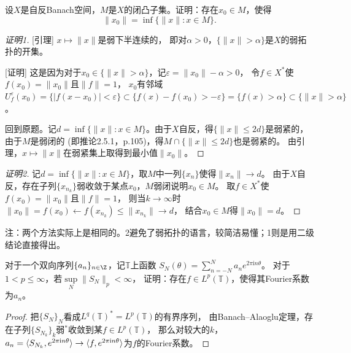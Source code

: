\begin{19}
    设$X$是自反Banach空间，$M$是$X$的闭凸子集。证明：存在$x_0\in M$，使得
    $$\|x_0\|=\inf\{\|x\|:x\in M\}.$$
\end{19}
\begin{proof}[证明1]
    [引理] $x\mapsto\|x\|$是弱下半连续的，
    即对$\alpha>0$，$\{\|x\|>\alpha\}$是$X$的弱拓扑的开集。

    [证明] 这是因为对于$x_0\in\{\|x\|>\alpha\}$，记$\varepsilon=\|x_0\|-\alpha>0$，
    令$f\in X^*$使$f(x_0)=\|x_0\|$且$\|f\|=1$，
    $x_0$有邻域$U_{f}^{\varepsilon}(x_0)=\{|f(x-x_0)|<\varepsilon\}
    \subset\{f(x)-f(x_0)>-\varepsilon\}=\{f(x)>\alpha\}\subset\{\|x\|>\alpha\}$。

    回到原题。记$d=\inf\{\|x\|:x\in M\}$。由于$X$自反，得$\{\|x\|\leqslant2d\}$是弱紧的，
    由于$M$是弱闭的 (即推论2.5.1，p.105)，得$M\cap\{\|x\|\leqslant2d\}$也是弱紧的。
    由引理，$x\mapsto\|x\|$在弱紧集上取得到最小值$\|x_0\|$。
\end{proof}
\begin{proof}[证明2]
    记$d=\inf\{\|x\|:x\in M\}$，取$M$中一列$\{x_n\}$使得$\|x_n\|\to d$。
    由于$X$自反，存在子列$\{x_{n_k}\}$弱收敛于某点$x_0$，$M$弱闭说明$x_0\in M$。
    取$f\in X^*$使$f(x_0)=\|x_0\|$且$\|f\|=1$，
    则当$k\to\infty$时$\|x_0\|=f(x_0)\leftarrow f(x_{n_k})\leqslant\|x_{n_k}\|\to d$，
    结合$x_0\in M$得$\|x_0\|=d$。
\end{proof}
注：两个方法实际上是相同的。2避免了弱拓扑的语言，较简洁易懂；1则是用二级结论直接得出。

\begin{20}
    对于一个双向序列$\{a_n\}_{n\in\Z}$，记$\mathbb{T}$上函数
    $S_N(\theta)=\sum\limits_{n=-N}^N a_ne^{2\pi\mathrm{i}n\theta}$。
    对于$1<p\leqslant\infty$，若$\sup\limits_N\|S_N\|_p<\infty$，
    证明：存在$f\in L^p(\mathbb{T})$，使得其Fourier系数为$a_n$。
\end{20}
\begin{proof}
    把$\{S_N\}_N$看成$L^q(\mathbb{T})^*=L^p(\mathbb{T})$的有界序列，
    由Banach--Alaoglu定理，存在子列$\{S_{N_k}\}_k$弱$^*$收敛到某$f\in L^p(\mathbb{T})$，
    那么对较大的$k$，$a_n=\langle S_{N_k},e^{2\pi\mathrm{i}n\theta}\rangle
    \to\langle f,e^{2\pi\mathrm{i}n\theta}\rangle$为$f$的Fourier系数。
\end{proof}

